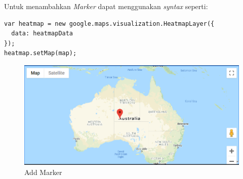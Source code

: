 Untuk menambahkan \textit{Marker} dapat menggunakan \textit{syntax} seperti:
\begin{lstlisting}
var heatmap = new google.maps.visualization.HeatmapLayer({
  data: heatmapData
});
heatmap.setMap(map);

\end{lstlisting}
  \begin{figure}[H]
    \centering
    \includegraphics[scale=0.5]{Gambar/add_marker.PNG}
    \caption{Add Marker}
    \label{fig:my_label}
\end{figure}




 
